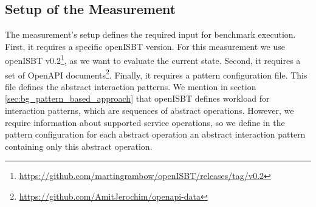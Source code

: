 \subsection{Setup of the Measurement}
\label{sec:analysis_1:setup}
The measurement's setup defines the required input for benchmark execution. First, it requires a specific openISBT version. For this measurement we use openISBT v0.2\footnote{\url{https://github.com/martingrambow/openISBT/releases/tag/v0.2}}, as we want to evaluate the current state. Second, it requires a set of OpenAPI documents\footnote{\url{https://github.com/AmitJerochim/openapi-data}}. Finally, it requires a pattern configuration file. This file defines the abstract interaction patterns. We mention in section \ref{sec:bg_pattern_based_approach} that openISBT defines workload for interaction patterns, which are sequences of abstract operations. 
However, we require information about supported service operations, so we define in the pattern configuration for each abstract operation an abstract interaction pattern containing only this abstract operation. 